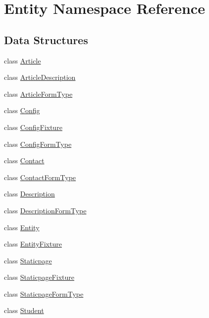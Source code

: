 \hypertarget{namespace_entity}{\section{Entity Namespace Reference}
\label{namespace_entity}
}
\subsection*{Data Structures}
\begin{DoxyCompactItemize}
\item 
class \hyperlink{class_entity_1_1_article}{Article}
\item 
class \hyperlink{class_entity_1_1_article_description}{Article\-Description}
\item 
class \hyperlink{class_entity_1_1_article_form_type}{Article\-Form\-Type}
\item 
class \hyperlink{class_entity_1_1_config}{Config}
\item 
class \hyperlink{class_entity_1_1_config_fixture}{Config\-Fixture}
\item 
class \hyperlink{class_entity_1_1_config_form_type}{Config\-Form\-Type}
\item 
class \hyperlink{class_entity_1_1_contact}{Contact}
\item 
class \hyperlink{class_entity_1_1_contact_form_type}{Contact\-Form\-Type}
\item 
class \hyperlink{class_entity_1_1_description}{Description}
\item 
class \hyperlink{class_entity_1_1_description_form_type}{Description\-Form\-Type}
\item 
class \hyperlink{class_entity_1_1_entity}{Entity}
\item 
class \hyperlink{class_entity_1_1_entity_fixture}{Entity\-Fixture}
\item 
class \hyperlink{class_entity_1_1_staticpage}{Staticpage}
\item 
class \hyperlink{class_entity_1_1_staticpage_fixture}{Staticpage\-Fixture}
\item 
class \hyperlink{class_entity_1_1_staticpage_form_type}{Staticpage\-Form\-Type}
\item 
class \hyperlink{class_entity_1_1_student}{Student}
\end{DoxyCompactItemize}

